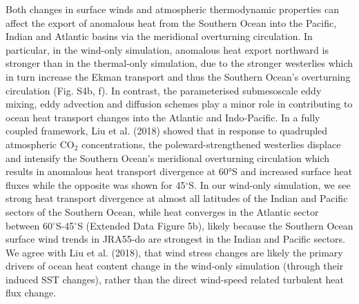 \documentclass{nature}
\begin{document}
	Both changes in surface winds and atmospheric thermodynamic properties can affect the export of anomalous heat from the Southern Ocean  into the Pacific, Indian and Atlantic basins via the meridional overturning circulation. In particular, in the wind-only simulation, anomalous heat export northward is stronger than in the thermal-only simulation, due to the stronger westerlies which in turn increase the Ekman transport and thus the Southern Ocean's overturning circulation (Fig. S4b, f). In contrast, the parameterised submesoscale eddy mixing, eddy advection and diffusion schemes play a minor role in contributing to ocean heat transport changes into the Atlantic and Indo-Pacific. In a fully coupled framework, Liu et al. (2018)\cite{liu2018southern} showed that in response to quadrupled atmospheric CO$_{2}$ concentrations, the poleward-strengthened westerlies displace and intensify the Southern Ocean's meridional overturning circulation which results in anomalous heat transport divergence at 60°S and increased surface heat fluxes while the opposite was shown for 45$^{\circ}$S. In our wind-only simulation, we see strong heat transport divergence at almost all latitudes of the Indian and Pacific sectors of the Southern Ocean, while heat converges in the Atlantic sector between 60$^{\circ}$S-45$^{\circ}$S (Extended Data Figure 5b), likely because the Southern Ocean surface wind trends in JRA55-do are strongest in the Indian and Pacific sectors. We agree with Liu et al. (2018)\cite{liu2018southern}, that wind stress changes are likely the primary drivers of ocean heat content change in the wind-only simulation (through their induced SST changes), rather than the direct wind-speed related turbulent heat flux change.
	
\end{document}
